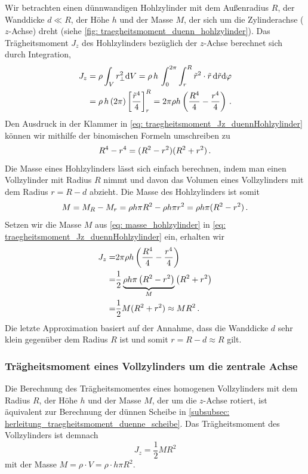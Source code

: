 Wir betrachten einen dünnwandigen Hohlzylinder mit dem Außenradius $R$, der Wanddicke $d \ll R$, der Höhe $h$ und der Masse $M$, der sich um die Zylinderachse ($z$-Achse) dreht (siehe \cref{fig: traegheitsmoment_duenn_hohlzylinder}). Das Trägheitsmoment $J_z$ des Hohlzylinders bezüglich der $z$-Achse berechnet sich durch Integration,
\begin{align}\label{eq: traegheitsmoment_Jz_duennHohlzylinder}
    J_z &= \rho \int_V r_{\perp}^2 \mathrm{d} V = \rho \, h \,\int_0^{2\pi} \int_{r}^{R} \tilde{r}^2 \cdot \tilde{r} \,\mathrm{d} \tilde{r} \mathrm{d} \varphi \\
    &= \rho\, h \,(2\pi) \left[ \frac{\tilde{r}^4}{4} \right]_{r}^R = 2\pi \rho h \left(\frac{R^4}{4} - \frac{r^4}{4} \right) \,. \nonumber
\end{align}
Den Ausdruck in der Klammer in \cref{eq: traegheitsmoment_Jz_duennHohlzylinder} können wir mithilfe der binomischen Formeln umschreiben zu
\begin{equation}\label{eq: binomische_formel_hohlzylinder}
    R^4 - r^4 = (R^2 - r^2)(R^2 + r^2) \,.
\end{equation} 
Die Masse eines Hohlzylinders lässt sich einfach berechnen, indem man einen Vollzylinder mit Radius $R$ nimmt und davon das Volumen eines Vollzylinders mit dem Radius $r = R-d$ abzieht. Die Masse des Hohlzylinders ist somit
\begin{equation}\label{eq: masse_hohlzylinder}
    M = M_R - M_r = \rho h \pi R^2 - \rho h \pi r^2 = \rho h \pi (R^2 - r^2) \,.
\end{equation}
Setzen wir die Masse $M$ aus \cref{eq: masse_hohlzylinder} in \cref{eq: traegheitsmoment_Jz_duennHohlzylinder} ein, erhalten wir 
\begin{align}\label{eq: traegheitsmoment_Jz_duennHohlzylinder_mit_Masse}
    J_z =& 2\pi \rho h \left(\frac{R^4}{4} - \frac{r^4}{4} \right) \nonumber \\
        =& \frac{1}{2} \underbrace{\rho h \pi \left(R^2-r^2\right)}_{M}\left( R^2+r^2\right) \nonumber \\
        =& \frac{1}{2} M (R^2 + r^2) \approx M R^2 \,. 
\end{align}
Die letzte Approximation basiert auf der Annahme, dass die Wanddicke $d$ sehr klein gegenüber dem Radius $R$ ist und somit $r = R-d \approx R$ gilt.

\subsubsection{Trägheitsmoment eines Vollzylinders um die zentrale Achse}\label{subsubsec: herleitung_traegheitsmoment_vollzylinder}
Die Berechnung des Trägheitsmomentes eines homogenen Vollzylinders mit dem Radius $R$, der Höhe $h$ und der Masse $M$, der um die $z$-Achse rotiert, ist äquivalent zur Berechnung der dünnen Scheibe in \cref{subsubsec: herleitung_traegheitsmoment_duenne_scheibe}. Das Trägheitsmoment des Vollzylinders ist demnach 
\begin{equation}\label{eq: traegheitsmoment_vollzylinder_Jz}
    J_z = \frac{1}{2} M R^2
\end{equation}
mit der Masse $M = \rho \cdot V = \rho \cdot h \pi R^2$.

